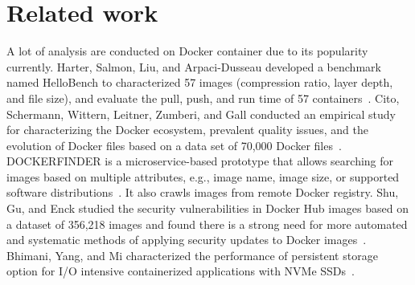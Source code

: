 \section{Related work}
\label{sec:related}

A lot of analysis are conducted on Docker container due to its popularity currently. 
Harter, Salmon, Liu, and Arpaci-Dusseau developed a benchmark named HelloBench to characterized 57 images (compression ratio, layer depth, and file size), and evaluate the pull, push, and run time of 57 containers~\cite{slacker}.
Cito, Schermann, Wittern, Leitner, Zumberi, and Gall conducted an empirical study for characterizing the Docker ecosystem, prevalent quality issues, and the evolution of Docker files based on a data set of 70,000 Docker files~\cite{dockervulnerabile}.
DOCKERFINDER is a microservice-based prototype that allows searching for images based on multiple attributes, e.g., image name, image size, or supported software distributions~\cite{dockerfinder}. It also crawls images from remote Docker registry.
Shu, Gu, and Enck studied the security vulnerabilities in Docker Hub images based on a dataset of 356,218 images and found there is a strong need for more automated and systematic methods of applying security updates to Docker images~\cite{analysisdockergithub}.
Bhimani, Yang, and Mi characterized the performance of persistent storage option for I/O intensive containerized applications with NVMe SSDs~\cite{dockerssd}.

